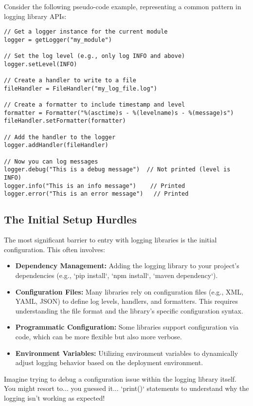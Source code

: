 \documentclass{article}
\begin{document}
{{{{Consider the following pseudo-code example, representing a common pattern in logging library APIs:

\begin{verbatim}
// Get a logger instance for the current module
logger = getLogger("my_module")

// Set the log level (e.g., only log INFO and above)
logger.setLevel(INFO)

// Create a handler to write to a file
fileHandler = FileHandler("my_log_file.log")

// Create a formatter to include timestamp and level
formatter = Formatter("%(asctime)s - %(levelname)s - %(message)s")
fileHandler.setFormatter(formatter)

// Add the handler to the logger
logger.addHandler(fileHandler)

// Now you can log messages
logger.debug("This is a debug message")  // Not printed (level is INFO)
logger.info("This is an info message")    // Printed
logger.error("This is an error message")   // Printed
\end{verbatim}

\subsection*{The Initial Setup Hurdles}

The most significant barrier to entry with logging libraries is the initial configuration.  This often involves:

\begin{itemize}
    \item \textbf{Dependency Management:}  Adding the logging library to your project's dependencies (e.g., `pip install`, `npm install`, `maven dependency`).
    \item \textbf{Configuration Files:} Many libraries rely on configuration files (e.g., XML, YAML, JSON) to define log levels, handlers, and formatters. This requires understanding the file format and the library's specific configuration syntax.
    \item \textbf{Programmatic Configuration:} Some libraries support configuration via code, which can be more flexible but also more verbose.
    \item \textbf{Environment Variables:} Utilizing environment variables to dynamically adjust logging behavior based on the deployment environment.
\end{itemize}

Imagine trying to debug a configuration issue within the logging library itself. You might resort to... you guessed it... `print()` statements to understand why the logging isn't working as expected!

}}}}
\end{document}
